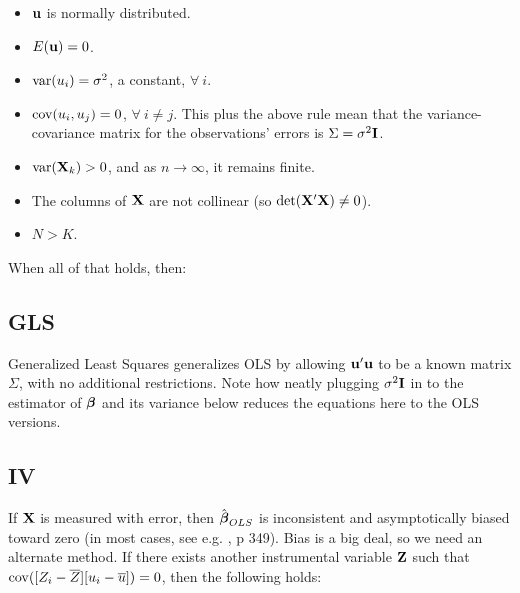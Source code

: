 \begin{itemize}
\item ${\bf u}$ is normally distributed.
\item $E({\bf u}) = 0$.
\item $\operatorname{var}(u_i) = \sigma^2$, a constant, $\forall\ i$.
\item $\operatorname{cov}(u_i, u_j) = 0$, $\forall\ i\neq j$. This plus the above rule
mean that the variance-covariance matrix for the observations' errors is
$\Sigma =
\sigma^2{\bf I}$.
\item $\operatorname{var}({\bf X}_k)>0$, and as $n\to\infty$, it remains finite.
\item The columns of ${\bf X}$ are not collinear (so $\det({\bf X}'{\bf X})\neq 0$).
\item $N>K$.
\end{itemize}

When all of that holds, then:


\subsection{GLS} \label{GLS}
Generalized Least Squares generalizes OLS by allowing ${\bf u}'{\bf u}$ to be a
known matrix $\Sigma$, with no additional restrictions.
Note how neatly plugging $\sigma^2{\bf I}$ in to the
estimator of ${\mbox{\boldmath$\beta$}}$ and its variance below reduces the equations here to the OLS
versions.


\subsection{IV}  
	\label{IV} 
If ${\bf X}$ is measured with error, then $\hat{{\mbox{\boldmath$\beta$}}}_{OLS}$ is inconsistent and
asymptotically biased toward zero (in most cases, see e.g. \cite{kmenta},
p 349). Bias is a big deal, so we need an alternate method. If there exists
another instrumental variable ${\bf Z}$ such that $\operatorname{cov}([Z_i-\overline
Z][u_i-\overline u])=0$, then the following holds:

